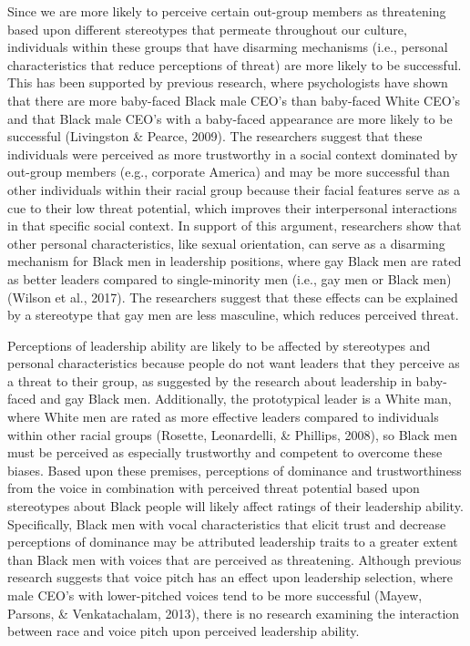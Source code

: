 \documentclass[
  english,
  man]{apa6}
\begin{document}
Since we are more likely to perceive certain out-group members as threatening based upon different stereotypes that permeate throughout our culture, individuals within these groups that have disarming mechanisms (i.e., personal characteristics that reduce perceptions of threat) are more likely to be successful. This has been supported by previous research, where psychologists have shown that there are more baby-faced Black male CEO's than baby-faced White CEO's and that Black male CEO's with a baby-faced appearance are more likely to be successful (Livingston \& Pearce, 2009). The researchers suggest that these individuals were perceived as more trustworthy in a social context dominated by out-group members (e.g., corporate America) and may be more successful than other individuals within their racial group because their facial features serve as a cue to their low threat potential, which improves their interpersonal interactions in that specific social context. In support of this argument, researchers show that other personal characteristics, like sexual orientation, can serve as a disarming mechanism for Black men in leadership positions, where gay Black men are rated as better leaders compared to single-minority men (i.e., gay men or Black men) (Wilson et al., 2017). The researchers suggest that these effects can be explained by a stereotype that gay men are less masculine, which reduces perceived threat.

Perceptions of leadership ability are likely to be affected by stereotypes and personal characteristics because people do not want leaders that they perceive as a threat to their group, as suggested by the research about leadership in baby-faced and gay Black men. Additionally, the prototypical leader is a White man, where White men are rated as more effective leaders compared to individuals within other racial groups (Rosette, Leonardelli, \& Phillips, 2008), so Black men must be perceived as especially trustworthy and competent to overcome these biases. Based upon these premises, perceptions of dominance and trustworthiness from the voice in combination with perceived threat potential based upon stereotypes about Black people will likely affect ratings of their leadership ability. Specifically, Black men with vocal characteristics that elicit trust and decrease perceptions of dominance may be attributed leadership traits to a greater extent than Black men with voices that are perceived as threatening. Although previous research suggests that voice pitch has an effect upon leadership selection, where male CEO's with lower-pitched voices tend to be more successful (Mayew, Parsons, \& Venkatachalam, 2013), there is no research examining the interaction between race and voice pitch upon perceived leadership ability.
\end{document}
